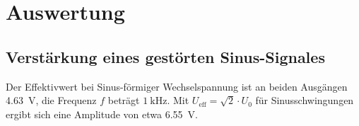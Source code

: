 \newpage
\section{Auswertung}
\label{sec:Auswertung}
\subsection{Verstärkung eines gestörten Sinus-Signales}
\label{sec:Auswertung1}
Der Effektivwert bei Sinus-förmiger Wechselspannung ist an beiden Ausgängen \SI{4.63}{\volt}, die Frequenz $f$ beträgt $\SI{1}{\kilo\hertz}$.
Mit $U_\text{eff}=\sqrt{2}\cdot U_0$ für Sinusschwingungen ergibt sich eine Amplitude von etwa \SI{6.55}{\volt}.


